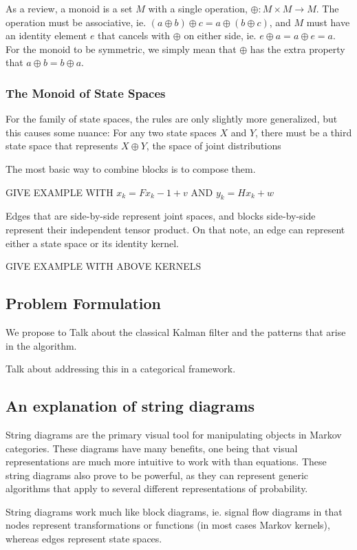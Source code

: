 \documentclass[letterpaper, 10 pt, conference]{ieeeconf}  %
\begin{document}
As a review, a monoid is a set $M$ with a single operation, $\oplus: M\times M \rightarrow M$. The operation must be associative, ie. $(a\oplus b) \oplus c = a \oplus (b\oplus c)$, and $M$ must have an identity element $e$ that cancels with $\oplus$ on either side, ie. $e\oplus a = a\oplus e = a$.
For the monoid to be symmetric, we simply mean that $\oplus$ has the extra property that $a\oplus b = b\oplus a$.

\subsubsection{The Monoid of State Spaces}
For the family of state spaces, the rules are only slightly more generalized, but this causes some nuance:
For any two state spaces $X$ and $Y$, there must be a third state space that represents $X\oplus Y$, the space of joint distributions 

The most basic way to combine blocks is to compose them.

GIVE EXAMPLE WITH $x_k = Fx_k-1 + v$ AND $y_k = Hx_k + w$

Edges that are side-by-side represent joint spaces, and blocks side-by-side represent their independent tensor product.
On that note, an edge can represent either a state space or its identity kernel.

GIVE EXAMPLE WITH ABOVE KERNELS

\subsection{Problem Formulation}

We propose to 
Talk about the classical Kalman filter and the patterns that arise in the algorithm.

Talk about addressing this in a categorical framework.

\subsection{An explanation of string diagrams}

String diagrams are the primary visual tool for manipulating objects in Markov categories.
These diagrams have many benefits, one being that visual representations are much more intuitive to work with than equations.
These string diagrams also prove to be powerful, as they can represent generic algorithms that apply to several different representations of probability.

String diagrams work much like block diagrams, ie. signal flow diagrams in that nodes represent transformations or functions (in most cases Markov kernels), whereas edges represent state spaces.
\end{document}
